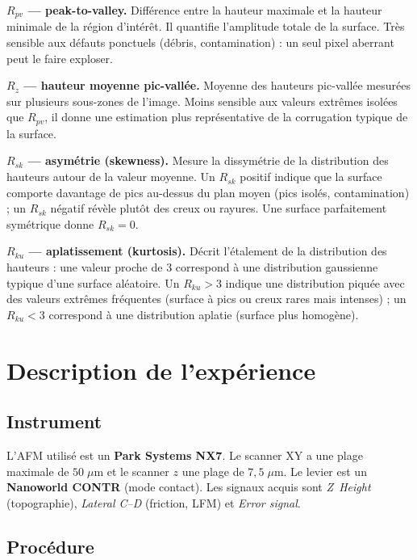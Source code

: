 \documentclass[a4paper,10pt]{article}
\begin{document}
\textbf{$R_{pv}$ --- peak-to-valley.}
Différence entre la hauteur maximale et la hauteur minimale de la région d'intérêt.
Il quantifie l'amplitude totale de la surface. Très sensible aux défauts ponctuels
(débris, contamination) : un seul pixel aberrant peut le faire exploser.

\textbf{$R_z$ --- hauteur moyenne pic-vallée.}
Moyenne des hauteurs pic-vallée mesurées sur plusieurs sous-zones de l'image.
Moins sensible aux valeurs extrêmes isolées que $R_{pv}$, il donne une estimation
plus représentative de la corrugation typique de la surface.

\textbf{$R_{sk}$ --- asymétrie (skewness).}
Mesure la dissymétrie de la distribution des hauteurs autour de la valeur moyenne.
Un $R_{sk}$ positif indique que la surface comporte davantage de pics au-dessus du
plan moyen (pics isolés, contamination) ; un $R_{sk}$ négatif révèle plutôt des
creux ou rayures. Une surface parfaitement symétrique donne $R_{sk}=0$.

\textbf{$R_{ku}$ --- aplatissement (kurtosis).}
Décrit l'étalement de la distribution des hauteurs : une valeur proche de 3
correspond à une distribution gaussienne typique d'une surface aléatoire. Un
$R_{ku}>3$ indique une distribution piquée avec des valeurs extrêmes fréquentes
(surface à pics ou creux rares mais intenses) ; un $R_{ku}<3$ correspond à une
distribution aplatie (surface plus homogène).


\section{Description de l'expérience}

\subsection{Instrument}

L'AFM utilisé est un \textbf{Park Systems NX7}. Le scanner XY a une plage maximale
de $50\;\mu$m et le scanner $z$ une plage de $7{,}5\;\mu$m. Le levier est un
\textbf{Nanoworld CONTR} (mode contact). Les signaux acquis sont \textit{Z~Height}
(topographie), \textit{Lateral C--D} (friction, LFM) et \textit{Error signal}.

\subsection{Procédure}
\end{document}
